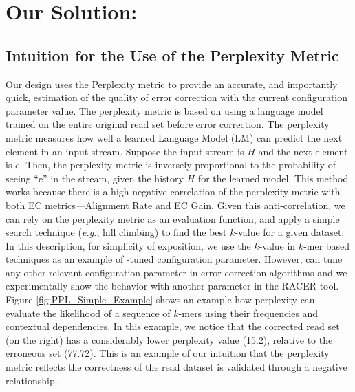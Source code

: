 \section{Our Solution: {\bf \name}}
\subsection{Intuition for the Use of the Perplexity Metric}
Our design uses the Perplexity metric to provide an accurate, and importantly quick, estimation of the quality of error correction with the current configuration parameter value. %
The perplexity metric is based on using a language model trained on the entire original read set before error correction.
The perplexity metric measures how well a learned Language Model (LM) can predict the next element in an input stream. Suppose the input stream is $H$ and the next element is $e$. Then, the perplexity metric is inversely proportional to the probability of seeing ``e'' in the stream, given the history $H$ for the learned model.
This method works because there is a high negative correlation of the perplexity metric with both EC metrics---Alignment Rate and EC Gain.
Given this anti-correlation, we can rely on the perplexity metric as an evaluation function, and apply a simple search technique (\textit{e.g.}, hill climbing) to find the best $k$-value for a given dataset. In this description, for simplicity of exposition, we use the $k$-value in $k$-mer based techniques as an example of \name-tuned configuration parameter. However, \name can tune any other relevant configuration parameter in error correction algorithms and we experimentally show the behavior with another parameter in the RACER tool. 
Figure \ref{fig:PPL_Simple_Example} shows an example how perplexity can evaluate the likelihood of a sequence of $k$-mers using their frequencies and contextual dependencies. In this example, we notice that the corrected read set (\ie on the right) has a considerably lower perplexity value (15.2), relative to the erroneous set (77.72). This is an example of our intuition that the perplexity metric reflects the correctness of the read dataset is validated through a negative relationship.

